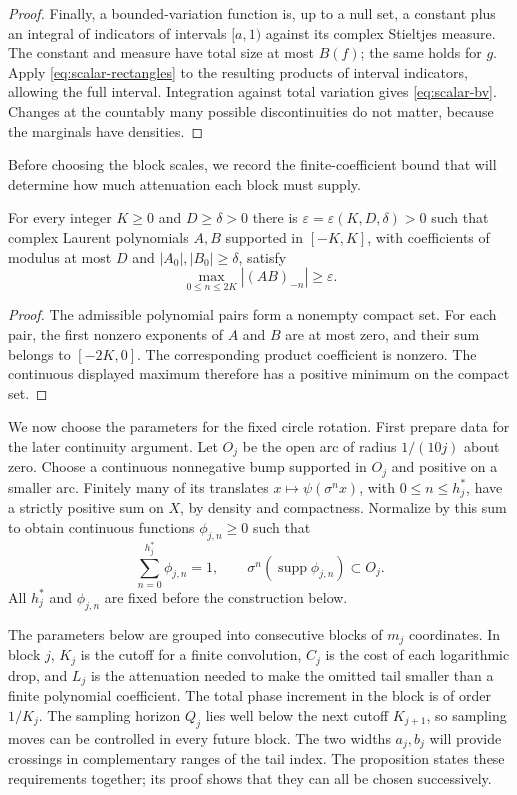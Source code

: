 \begin{proof}
Finally, a bounded-variation function is, up to a null set, a constant
plus an integral of indicators of intervals $[a,1)$ against its
complex Stieltjes measure.  The constant and measure have total size
at most $B(f)$; the same holds for $g$.  Apply
\eqref{eq:scalar-rectangles} to the resulting products of interval
indicators, allowing the full interval.  Integration against total
variation gives \eqref{eq:scalar-bv}.  Changes at the countably many
possible discontinuities do not matter, because the marginals have
densities.
\end{proof}

Before choosing the block scales, we record the finite-coefficient bound
that will determine how much attenuation each block must supply.

\begin{lemma}\label{lem:polynomial-coefficient}
For every integer $K\ge0$ and $D\ge\delta>0$ there is
$\varepsilon=\varepsilon(K,D,\delta)>0$ such that complex Laurent polynomials
$A,B$ supported in $[-K,K]$, with coefficients of modulus at most $D$
and $|A_0|,|B_0|\ge\delta$, satisfy
\[
 \max_{0\le n\le2K}|(AB)_{-n}|\ge\varepsilon.
\]
\end{lemma}

\begin{proof}
The admissible polynomial pairs form a nonempty compact set.
For each pair, the first nonzero exponents of $A$ and $B$ are at most
zero, and their sum belongs to $[-2K,0]$.  The corresponding product
coefficient is nonzero.  The continuous displayed maximum therefore
has a positive minimum on the compact set.
\end{proof}

We now choose the parameters for the fixed circle rotation.  First prepare
data for the later continuity argument.  Let $O_j$ be the
open arc of radius $1/(10j)$ about zero.  Choose a continuous nonnegative
bump supported in $O_j$ and positive on a smaller arc.  Finitely many of
its translates $x\mapsto\psi(\sigma^n x)$, with $0\le n\le h_j^*$,
have a strictly positive sum on $X$, by density and compactness.
Normalize by this sum to obtain continuous functions $\phi_{j,n}\ge0$
such that
\begin{equation}\label{eq:partition}
 \sum_{n=0}^{h_j^*}\phi_{j,n}=1,
 \qquad \sigma^n(\operatorname{supp}\phi_{j,n})\subset O_j.
\end{equation}
All $h_j^*$ and $\phi_{j,n}$ are fixed before the construction below.

The parameters below are grouped into consecutive blocks of $m_j$
coordinates.  In block $j$, $K_j$ is the cutoff for a finite convolution,
$C_j$ is the cost of each logarithmic drop, and $L_j$ is the attenuation
needed to make the omitted tail smaller than a finite polynomial
coefficient.  The total phase increment in the block is of order
$1/K_j$.  The sampling horizon $Q_j$ lies well below the next cutoff
$K_{j+1}$, so sampling moves can be controlled in every future block.
The two widths $a_j,b_j$ will provide crossings in complementary ranges
of the tail index.  The proposition states these requirements together;
its proof shows that they can all be chosen successively.

